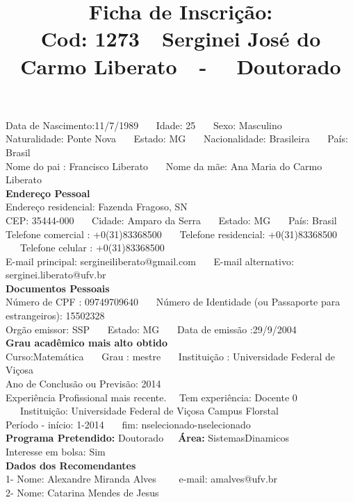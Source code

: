 \documentclass[11pt]{article}
\title{\vspace*{-4cm} Ficha de Inscrição: \\Cod: 1273\ \ Serginei José  do Carmo Liberato\ \ - \ \ Doutorado 
 }
\date{}
\begin{document}
\maketitle
\vspace*{-1.5cm}
\noindent Data de Nascimento:11/7/1989
\ \ \ Idade: 25   \ \ \ Sexo: Masculino
\\
Naturalidade: Ponte Nova  
\ \ \  Estado: MG
\ \ \  Nacionalidade: Brasileira
\ \ \ País: Brasil
\\        
Nome do pai : Francisco Liberato
\ \ \ Nome da mãe: Ana Maria do Carmo Liberato          
\\[0.2cm]                     
\textbf{Endereço Pessoal} 
\\ 
\noindent Endereço residencial: Fazenda Fragoso, SN
\\
        CEP: 35444-000 
\ \ \ Cidade: Amparo da Serra 
\ \ \ Estado: MG 
\ \ \ País: Brasil
\\		
		Telefone comercial : +0(31)83368500
\ \ \ Telefone residencial: +0(31)83368500
\ \ \ Telefone celular : +0(31)83368500
\\
E-mail principal: sergineiliberato@gmail.com
\ \ \ E-mail alternativo: serginei.liberato@ufv.br 
\\[0.2cm] 
\textbf{Documentos Pessoais}
\\
\noindent Número de CPF : 09749709640
\ \ \ Número de Identidade (ou Passaporte para estrangeiros): 15502328
\\
Orgão emissor: SSP
\ \ \ Estado: MG
\ \ \ Data de emissão :29/9/2004
\\[0.3cm]
\textbf{Grau acadêmico mais alto obtido}
\\	
Curso:Matemática
\ \ \ Grau : mestre
\ \ \ Instituição : Universidade Federal de Viçosa
\\			
Ano de Conclusão ou Previsão: 2014
\\ 
Experiência Profissional mais recente. \ \  
Tem experiência: Docente 0  
\ \ \ Instituição: Universidade Federal de Viçosa Campus Florstal
\\  
Período - início: 1-2014
\ \ \ fim: nselecionado-nselecionado
\\[0.2cm] 
\textbf{Programa Pretendido:} Doutorado\ \ \ \textbf{Área:} SistemasDinamicos\\
Interesse em bolsa: Sim
\\[0.3cm]		
\textbf{Dados dos Recomendantes} 
\\
1- Nome: Alexandre Miranda Alves
\ \ \ \  e-mail: amalves@ufv.br 
\\
2- Nome: Catarina Mendes de Jesus
\end{document}
